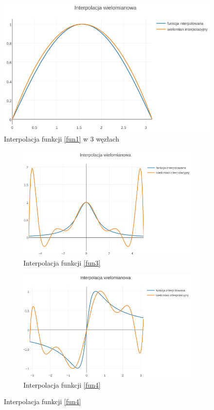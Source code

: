 \documentclass{article}
\begin{document}
\begin{figure}[ht]
	\begin{center}
		\includegraphics[width=13cm]{lagrange_sin}
	\end{center}
	\caption{Interpolacja funkcji \eqref{fun1} w 3 węzłach}
	\label{fig:rysunek1}
\end{figure}

\begin{figure}[ht]
	\centering
	\begin{subfigure}[ht]{0.5\textwidth}
		\includegraphics[width=\textwidth]{lagrange_c}
		\caption{Interpolacja funkcji \eqref{fun3}}
		\label{fig:2}
	\end{subfigure}%
	\begin{subfigure}[ht]{0.5\textwidth}
		\includegraphics[width=\textwidth]{lagrange_d}
		\caption{Interpolacja funkcji \eqref{fun4}}
		\label{fig:3}
	\end{subfigure}
\end{figure}
\end{document}
